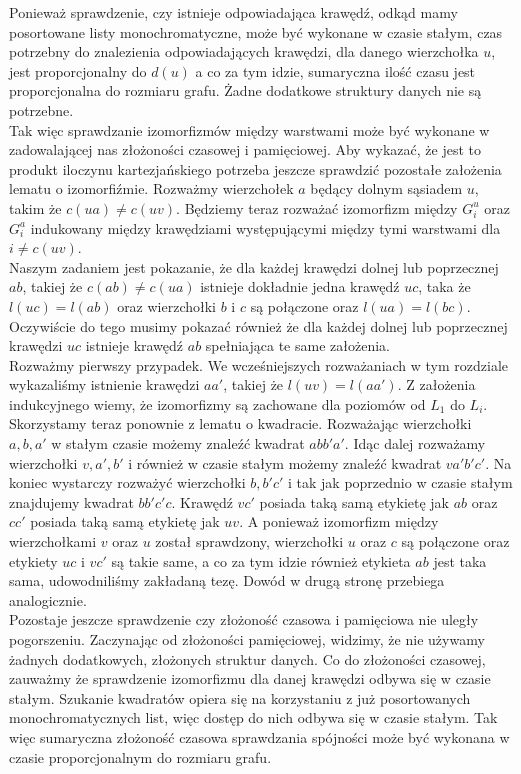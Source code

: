 \documentclass[12pt,a4paper,titlepage]{article}
\begin{document}
Ponieważ sprawdzenie, czy istnieje odpowiadająca krawędź, odkąd mamy posortowane listy monochromatyczne, może być wykonane w czasie stałym, czas potrzebny do znalezienia odpowiadających krawędzi, dla danego wierzchołka $u$, jest proporcjonalny do $d(u)$ a co za tym idzie, sumaryczna ilość czasu jest proporcjonalna do rozmiaru grafu. Żadne dodatkowe struktury danych nie są potrzebne. \\
Tak więc sprawdzanie izomorfizmów między warstwami może być wykonane w zadowalającej nas złożoności czasowej i pamięciowej. Aby wykazać, że jest to produkt iloczynu kartezjańskiego potrzeba jeszcze sprawdzić pozostałe założenia lematu o izomorfiźmie. Rozważmy wierzchołek $a$ będący dolnym sąsiadem $u$, takim że $c(ua) \neq c(uv)$. Będziemy teraz rozważać izomorfizm między $G^u_i$ oraz $G^a_i$ indukowany między krawędziami występującymi między tymi warstwami dla $i \neq c(uv)$.\\
Naszym zadaniem jest pokazanie, że dla każdej krawędzi dolnej lub poprzecznej $ab$, takiej że $c(ab) \neq c(ua)$ istnieje dokładnie jedna krawędź $uc$, taka że $l(uc)=l(ab)$ oraz wierzchołki $b$ i $c$ są połączone oraz $l(ua)=l(bc)$. Oczywiście do tego musimy pokazać również że dla każdej dolnej lub poprzecznej krawędzi $uc$ istnieje krawędź $ab$ spełniająca te same założenia.\\
Rozważmy pierwszy przypadek. We wcześniejszych rozważaniach w tym rozdziale wykazaliśmy istnienie krawędzi $aa'$, takiej że $l(uv)=l(aa')$. Z założenia indukcyjnego wiemy, że izomorfizmy są zachowane dla poziomów od $L_1$ do $L_i$. Skorzystamy teraz ponownie z lematu o kwadracie. Rozważając wierzchołki $a,b,a'$ w stałym czasie możemy znaleźć kwadrat $abb'a'$. Idąc dalej rozważamy wierzchołki $v,a',b'$ i również w czasie stałym możemy znaleźć kwadrat $va'b'c'$. Na koniec wystarczy rozważyć wierzchołki $b,b'c'$ i tak jak poprzednio w czasie stałym znajdujemy kwadrat $bb'c'c$. Krawędź $vc'$ posiada taką samą etykietę jak $ab$ oraz $cc'$ posiada taką samą etykietę jak $uv$. A ponieważ izomorfizm między wierzchołkami $v$ oraz $u$ został sprawdzony, wierzchołki $u$ oraz $c$ są połączone oraz etykiety $uc$ i $vc'$ są takie same, a co za tym idzie również etykieta $ab$ jest taka sama, udowodniliśmy zakładaną tezę. Dowód w drugą stronę przebiega analogicznie.\\
Pozostaje jeszcze sprawdzenie czy złożoność czasowa i pamięciowa nie uległy pogorszeniu. Zaczynając od złożoności pamięciowej, widzimy, że nie używamy żadnych dodatkowych, złożonych struktur danych. Co do złożoności czasowej, zauważmy że sprawdzenie izomorfizmu dla danej krawędzi odbywa się w czasie stałym. Szukanie kwadratów opiera się na korzystaniu z już posortowanych monochromatycznych list, więc dostęp do nich odbywa się w czasie stałym. Tak więc sumaryczna złożoność czasowa sprawdzania spójności może być wykonana w czasie proporcjonalnym do rozmiaru grafu.\\
\newpage
\end{document}
